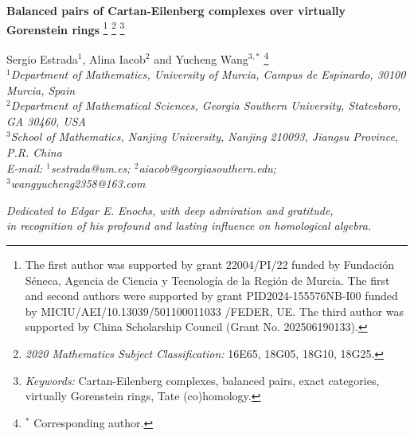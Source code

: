 \documentclass[reqno,12pt]{amsart}
\numberwithin{equation}{section}
\renewcommand{\baselinestretch}{1.2}
\theoremstyle{plain}
\theoremstyle{definition}
\begin{document}
\begin{center}
{\large \bf Balanced pairs of Cartan-Eilenberg complexes over virtually Gorenstein rings}
\footnote{ The first author was supported by grant 22004/PI/22 funded by Fundaci\'on S\'eneca, Agencia de Ciencia y Tecnolog\'ia de la Regi\'on de Murcia. The first and second authors were supported by grant PID2024-155576NB-I00 funded by MICIU/AEI/10.13039/501100011033 /FEDER, UE. The third author was supported by China Scholarship Council (Grant No. 202506190133). }
\footnote{{\it 2020 Mathematics Subject Classification:} 16E65, 18G05, 18G10, 18G25.}
\footnote{{\it Keywords:} Cartan-Eilenberg complexes, balanced pairs, exact categories, virtually Gorenstein rings, Tate (co)homology.}

\vspace{0.1cm}
Sergio Estrada$^{1}$, Alina Iacob$^{2}$ and Yucheng Wang$^{3,*}$ \footnote{$^*$ Corresponding author.}\\
{\renewcommand{\baselinestretch}{1}\fontsize{9}{9.5}\selectfont\itshape
$^{1}$Department of Mathematics, University of Murcia, Campus de Espinardo, 30100 Murcia, Spain\\
$^{2}$Department of Mathematical Sciences, Georgia Southern University, Statesboro, GA 30460, USA\\
$^{3}$School of Mathematics, Nanjing University, Nanjing 210093, Jiangsu Province, P.R. China\\
E-mail: $^{1}$sestrada@um.es; $^{2}$aiacob@georgiasouthern.edu;\\
$^{3}$wangyucheng2358@163.com}

\vspace{0.35cm}
{\small\itshape Dedicated to Edgar E. Enochs, with deep admiration and gratitude,\\
in recognition of his profound and lasting influence on homological algebra.}
\end{center}








\end{document}
